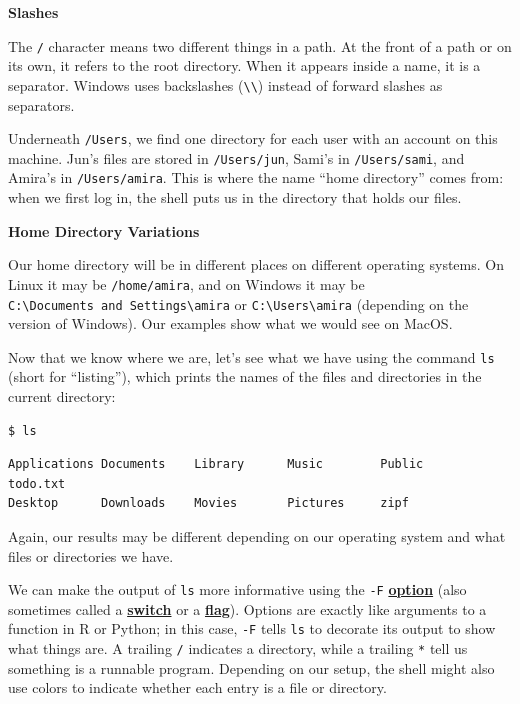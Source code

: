 \documentclass[
]{krantz}
\renewenvironment{quote}{\begin{VF}}{\end{VF}}
\newcommand{\gref}[2]{\hyperlink{#2}{\textbf{#1}}}
\begin{document}
\begin{quote}
\textbf{Slashes}

The \texttt{/} character means two different things in a path.
At the front of a path or on its own,
it refers to the root directory.
When it appears inside a name, it is a separator.
Windows uses backslashes (\texttt{\textbackslash{}\textbackslash{}}) instead of forward slashes as separators.
\end{quote}

Underneath \texttt{/Users},
we find one directory for each user with an account on this machine.
Jun's files are stored in \texttt{/Users/jun},
Sami's in \texttt{/Users/sami},
and Amira's in \texttt{/Users/amira}.
This is where the name ``home directory'' comes from:
when we first log in,
the shell puts us in the directory that holds our files.

\begin{quote}
\textbf{Home Directory Variations}

Our home directory will be in different places on different operating systems.
On Linux it may be \texttt{/home/amira},
and on Windows it may be \texttt{C:\textbackslash{}Documents\ and\ Settings\textbackslash{}amira} or \texttt{C:\textbackslash{}Users\textbackslash{}amira}
(depending on the version of Windows).
Our examples show what we would see on MacOS.
\end{quote}

Now that we know where we are,
let's see what we have using the command \texttt{ls}
(short for ``listing''),
which prints the names of the files and directories in the current directory:

\begin{verbatim}
$ ls
\end{verbatim}

\begin{verbatim}
Applications Documents    Library      Music        Public         todo.txt
Desktop      Downloads    Movies       Pictures     zipf
\end{verbatim}

Again,
our results may be different depending on our operating system
and what files or directories we have.

We can make the output of \texttt{ls} more informative using the \texttt{-F} \gref{option}{command\_line\_option}
(also sometimes called a \gref{switch}{command\_line\_switch} or a \gref{flag}{command\_line\_flag}).
Options are exactly like arguments to a function in R or Python;
in this case,
\texttt{-F} tells \texttt{ls} to decorate its output to show what things are.
A trailing \texttt{/} indicates a directory,
while a trailing \texttt{*} tell us something is a runnable program.
Depending on our setup,
the shell might also use colors to indicate whether each entry is a file or directory.
\end{document}
